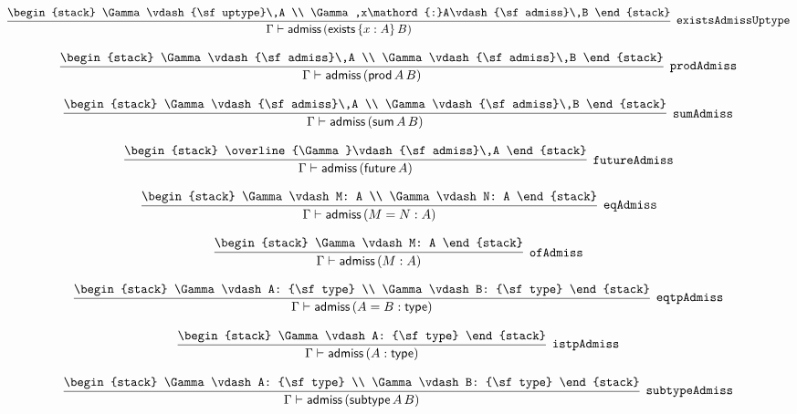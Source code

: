 \[
\infer[{\tt existsAdmissUptype}]{\Gamma \vdash {\sf admiss}\,({\sf exists}\,\{x : A\}\,B)}{
\begin{stack}
\Gamma \vdash {\sf uptype}\,A
\\
\Gamma ,x\mathord{:}A\vdash {\sf admiss}\,B
\end{stack}}
\]

\[
\infer[{\tt prodAdmiss}]{\Gamma \vdash {\sf admiss}\,({\sf prod}\,A\,B)}{
\begin{stack}
\Gamma \vdash {\sf admiss}\,A
\\
\Gamma \vdash {\sf admiss}\,B
\end{stack}}
\]

\[
\infer[{\tt sumAdmiss}]{\Gamma \vdash {\sf admiss}\,({\sf sum}\,A\,B)}{
\begin{stack}
\Gamma \vdash {\sf admiss}\,A
\\
\Gamma \vdash {\sf admiss}\,B
\end{stack}}
\]

\[
\infer[{\tt futureAdmiss}]{\Gamma \vdash {\sf admiss}\,({\sf future}\,A)}{
\begin{stack}
\overline{\Gamma}\vdash {\sf admiss}\,A
\end{stack}}
\]

\[
\infer[{\tt eqAdmiss}]{\Gamma \vdash {\sf admiss}\,(M= N: A)}{
\begin{stack}
\Gamma \vdash M: A
\\
\Gamma \vdash N: A
\end{stack}}
\]

\[
\infer[{\tt ofAdmiss}]{\Gamma \vdash {\sf admiss}\,(M: A)}{
\begin{stack}
\Gamma \vdash M: A
\end{stack}}
\]

\[
\infer[{\tt eqtpAdmiss}]{\Gamma \vdash {\sf admiss}\,(A= B: {\sf type})}{
\begin{stack}
\Gamma \vdash A: {\sf type}
\\
\Gamma \vdash B: {\sf type}
\end{stack}}
\]

\[
\infer[{\tt istpAdmiss}]{\Gamma \vdash {\sf admiss}\,(A: {\sf type})}{
\begin{stack}
\Gamma \vdash A: {\sf type}
\end{stack}}
\]

\[
\infer[{\tt subtypeAdmiss}]{\Gamma \vdash {\sf admiss}\,({\sf subtype}\,A\,B)}{
\begin{stack}
\Gamma \vdash A: {\sf type}
\\
\Gamma \vdash B: {\sf type}
\end{stack}}
\]

